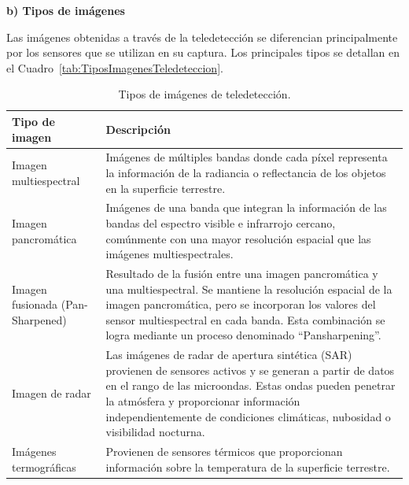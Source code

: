 \textbf{b) Tipos de imágenes}

Las imágenes obtenidas a través de la teledetección se diferencian principalmente por los sensores que se utilizan en su captura. Los principales tipos se detallan en el Cuadro~\ref{tab:TiposImagenesTeledeteccion}.

\begin{table}[H]
    \caption{Tipos de imágenes de teledetección.}
    \begin{tabularx}{1\textwidth}{p{4.5cm}X}
        \hline
        \textbf{Tipo de imagen}                       & \textbf{Descripción}                                                                                                                                                                                                                                                                              \\
        \hline
        Imagen multiespectral                         & Imágenes de múltiples bandas donde cada píxel representa la información de la radiancia o reflectancia de los objetos en la superficie terrestre.                                                                                                                                                 \\
        \hline
        Imagen pancromática                           & Imágenes de una banda que integran la información de las bandas del espectro visible e infrarrojo cercano, comúnmente con una mayor resolución espacial que las imágenes multiespectrales.                                                                                                        \\
        \hline
        Imagen fusionada \newline (Pan-Sharpened)     & Resultado de la fusión entre una imagen pancromática y una multiespectral. Se mantiene la resolución espacial de la imagen pancromática, pero se incorporan los valores del sensor multiespectral en cada banda. Esta combinación se logra mediante un proceso denominado ``Pansharpening''.      \\
        \hline
        Imagen de radar                               & Las imágenes de radar de apertura sintética (SAR) provienen de sensores activos y se generan a partir de datos en el rango de las microondas. Estas ondas pueden penetrar la atmósfera y proporcionar información independientemente de condiciones climáticas, nubosidad o visibilidad nocturna. \\
        \hline
        Imágenes termográficas                        & Provienen de sensores térmicos que proporcionan información sobre la temperatura de la superficie terrestre.                                                                                                                                                                                      \\

\end{tabularx}
\end{table}

